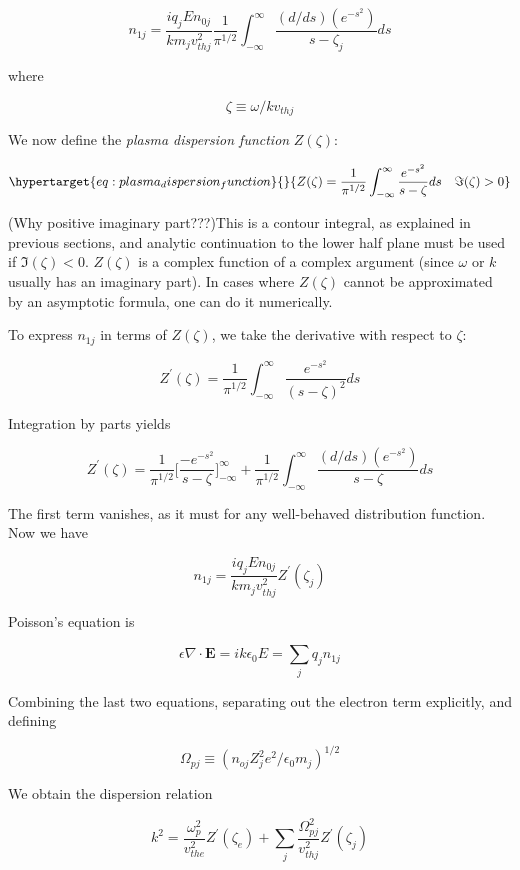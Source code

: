 \documentclass[
  notoc %
]{tufte-book}
\begin{document}
\[
n_{1j} = \frac{iq_j E n_{0j}}{km_j v_{thj}^2}\frac{1}{\pi^{1/2}}\int_{-\infty}^{\infty}\frac{(d/ds)(e^{-s^2})}{s -\zeta_j}ds
\]

where

\[
\zeta\equiv \omega/k v_{thj}
\]

We now define the \emph{plasma dispersion function} \(Z(\zeta)\):

\begin{equation}\protect\hypertarget{eq:plasma_dispersion_function}{}{
Z(\zeta) = \frac{1}{\pi^{1/2}}\int_{-\infty}^{\infty}\frac{e^{-s^2}}{s -\zeta}ds\quad \Im(\zeta)>0
}\label{eq:plasma_dispersion_function}\end{equation}

(Why positive imaginary part???)This is a contour integral, as explained
in previous sections, and analytic continuation to the lower half plane
must be used if \(\Im(\zeta)<0\). \(Z(\zeta)\) is a complex function of
a complex argument (since \(\omega\) or \(k\) usually has an imaginary
part). In cases where \(Z(\zeta)\) cannot be approximated by an
asymptotic formula, one can do it numerically.

To express \(n_{1j}\) in terms of \(Z(\zeta)\), we take the derivative
with respect to \(\zeta\):

\[
Z^\prime(\zeta) = \frac{1}{\pi^{1/2}}\int_{-\infty}^{\infty}\frac{e^{-s^2}}{(s -\zeta)^2}ds
\]

Integration by parts yields

\[
Z^\prime(\zeta) = \frac{1}{\pi^{1/2}}\Big[ \frac{-e^{-s^2}}{s-\zeta} \Big]_{-\infty}^{\infty} + \frac{1} {\pi^{1/2}}\int_{-\infty}^{\infty}\frac{(d/ds)(e^{-s^2})}{s -\zeta}ds
\]

The first term vanishes, as it must for any well-behaved distribution
function. Now we have

\[
n_{1j} = \frac{iq_j E n_{0j}}{km_j v_{thj}^2}Z^\prime(\zeta_j)
\]

Poisson's equation is

\[
\epsilon\nabla\cdot\mathbf{E} = ik\epsilon_0E = \sum_j q_j n_{1j}
\]

Combining the last two equations, separating out the electron term
explicitly, and defining

\[
\Omega_{pj}\equiv(n_{oj}Z_j^2 e^2/\epsilon_0 m_j)^{1/2}
\]

We obtain the dispersion relation

\[
k^2 = \frac{\omega_p^2}{v_{the}^2}Z^\prime(\zeta_e) + \sum_j\frac{\Omega_{pj}^2}{v_{thj}^2}Z^\prime(\zeta_j)
\]
\end{document}

